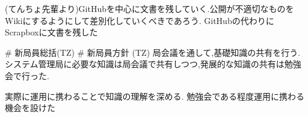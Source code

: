 (てんちょ先輩より)GitHubを中心に文書を残していく.公開が不適切なものをWikiにするようにして差別化していくべきであろう.
GitHubの代わりにScrapboxに文書を残した

# 新局員総括(TZ)
# 新局員方針 (TZ)
局会議を通して,基礎知識の共有を行う.
システム管理局に必要な知識は局会議で共有しつつ,発展的な知識の共有は勉強会で行った.

実際に運用に携わることで知識の理解を深める.
勉強会である程度運用に携わる機会を設けた


